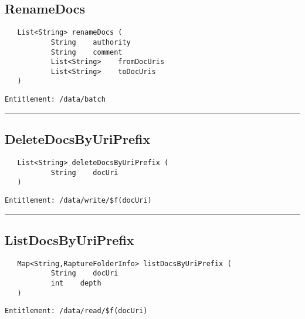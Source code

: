 \subsection{RenameDocs}
\label{Api:RenameDocs}
\begin{verbatim}
   List<String> renameDocs (
           String    authority
           String    comment
           List<String>    fromDocUris
           List<String>    toDocUris
   )
\end{verbatim}
\begin{Verbatim}[fontsize=\small, formatcom=\color{Maroon}]
  Entitlement: /data/batch
\end{Verbatim}



\rule{12cm}{2pt}
\subsection{DeleteDocsByUriPrefix}
\label{Api:DeleteDocsByUriPrefix}
\begin{verbatim}
   List<String> deleteDocsByUriPrefix (
           String    docUri
   )
\end{verbatim}
\begin{Verbatim}[fontsize=\small, formatcom=\color{Maroon}]
  Entitlement: /data/write/$f(docUri)
\end{Verbatim}



\rule{12cm}{2pt}
\subsection{ListDocsByUriPrefix}
\label{Api:ListDocsByUriPrefix}
\begin{verbatim}
   Map<String,RaptureFolderInfo> listDocsByUriPrefix (
           String    docUri
           int    depth
   )
\end{verbatim}
\begin{Verbatim}[fontsize=\small, formatcom=\color{Maroon}]
  Entitlement: /data/read/$f(docUri)
\end{Verbatim}




